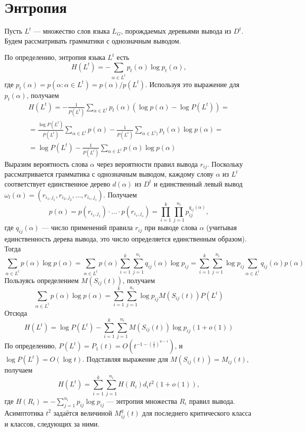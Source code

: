 \documentclass[12pt]{article}
\begin{document}
{\section{Энтропия}
Пусть $L^t$ --- множество слов языка $L_G$, порождаемых деревьями вывода из $D^t$. Будем рассматривать грамматики с однозначным выводом.

По определению, энтропия языка $L^t$ есть
\begin{equation*}
	H(L^t) = - \sum_{\alpha \in L^t} p_t(\alpha) \log p_t(\alpha),
\end{equation*}
где $p_t(\alpha) = p(\alpha : \alpha \in L^t) = p(\alpha) / p(L^t)$. Используя это выражение для $p_t(\alpha)$, получаем
\begin{multline*}
	H(L^t) = - \frac{1}{P(L^t)} \sum_{\alpha \in L^t} p_t(\alpha) \left( \log p(\alpha) - \log P(L^t) \right) = \\
	= \frac{\log P(L^t)}{P(L^t)} \sum_{\alpha \in L^t} p(\alpha) - \frac{1}{P(L^t)} \sum_{\alpha \in L^t)} p_t(\alpha) \log p(\alpha) = \\
	= \log P(L^t) - \frac{1}{P(L^t)} \sum_{\alpha \in L^t} p(\alpha) \log p(\alpha)
\end{multline*}
Выразим вероятность слова $\alpha$ через вероятности правил вывода $r_{ij}$. Поскольку рассматривается грамматика с однозначным выводом, каждому слову $\alpha$ из $L^t$ соответствует единственное дерево $d(\alpha)$ из $D^t$ и единственный левый вывод $\omega_l(\alpha) = (r_{i_1,j_1}, r_{i_2,j_2}, \ldots, r_{i_s,j_s})$. Получаем
\begin{equation*}
	p(\alpha) = p(r_{i_1,j_1}) \cdot \ldots \cdot p(r_{i_s,j_s}) = \prod_{i=1}^k \prod_{j=1}^{n_i} p_{ij}^{q_{ij}(\alpha)},
\end{equation*}
где $q_{ij}(\alpha)$ --- число применений правила $r_{ij}$ при выводе слова $\alpha$ (учитывая единственность дерева вывода, это число определяется единственным образом). Тогда
\begin{equation*}
	\sum_{\alpha \in L^t} p(\alpha) \log p(\alpha) = \sum_{\alpha \in L^t} p(\alpha) \sum_{i=1}^k \sum_{j=1}^{n_i} q_{ij}(\alpha) \log p_{ij} = \sum_{i=1}^k \sum_{j=1}^{n_i} \log p_{ij} \sum_{\alpha \in L^t} q_{ij}(\alpha) p(\alpha)
\end{equation*}
Пользуясь определением $M(S_{ij}(t))$, получаем
\begin{equation*}
	\sum_{\alpha \in L^t} p(\alpha) \log p(\alpha) = \sum_{i=1}^k \sum_{j=1}^{n_i} \log p_{ij} M(S_{ij}(t)) P(L^t)
\end{equation*}
Отсюда
\begin{equation*}
	H(L^t) = \log P(L^t) - \sum_{i=1}^k \sum_{j=1}^{n_i} M(S_{ij}(t)) \log p_{ij} (1 + o(1))
\end{equation*}
По определению, $P(L^t) = P_1(t) = O(t^{-1 -\left(\frac{1}{2}\right)^{w-1}})$, и $\log P(L^t) = O(\log t)$. Подставляя выражение для $M(S_{ij}(t)) = M_{ij}(t)$, получаем
\begin{equation*}
	H(L^t) = \sum_{i=1}^k \sum_{j=1}^{n_i} H(R_i) d_i t^2 (1 + o(1)),
\end{equation*}
где $H(R_i) = - \sum_{j=1}^{n_i} p_{ij} \log p_{ij}$ --- энтропия множества $R_i$ правил вывода. Асимптотика $t^2$ задаётся величиной $M^q_{ij}(t)$ для последнего критического класса и классов, следующих за ними.

}
\end{document}
